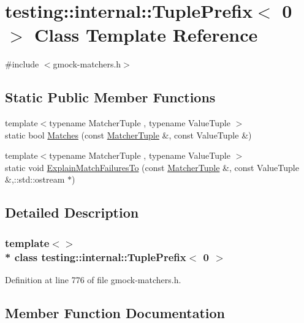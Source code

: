 \hypertarget{classtesting_1_1internal_1_1_tuple_prefix_3_010_01_4}{}\section{testing\+:\+:internal\+:\+:Tuple\+Prefix$<$ 0 $>$ Class Template Reference}
\label{classtesting_1_1internal_1_1_tuple_prefix_3_010_01_4}


{\ttfamily \#include $<$gmock-\/matchers.\+h$>$}

\subsection*{Static Public Member Functions}
\begin{DoxyCompactItemize}
\item 
{\footnotesize template$<$typename Matcher\+Tuple , typename Value\+Tuple $>$ }\\static bool \hyperlink{classtesting_1_1internal_1_1_tuple_prefix_3_010_01_4_a8bb323da9f209f4fef5d81d7c0b628e9}{Matches} (const \hyperlink{structtesting_1_1internal_1_1_matcher_tuple}{Matcher\+Tuple} \&, const Value\+Tuple \&)
\item 
{\footnotesize template$<$typename Matcher\+Tuple , typename Value\+Tuple $>$ }\\static void \hyperlink{classtesting_1_1internal_1_1_tuple_prefix_3_010_01_4_a8c86e2f864d1210f10f0faf980bc2758}{Explain\+Match\+Failures\+To} (const \hyperlink{structtesting_1_1internal_1_1_matcher_tuple}{Matcher\+Tuple} \&, const Value\+Tuple \&,\+::std\+::ostream $\ast$)
\end{DoxyCompactItemize}


\subsection{Detailed Description}
\subsubsection*{template$<$$>$\\*
class testing\+::internal\+::\+Tuple\+Prefix$<$ 0 $>$}



Definition at line 776 of file gmock-\/matchers.\+h.



\subsection{Member Function Documentation}
